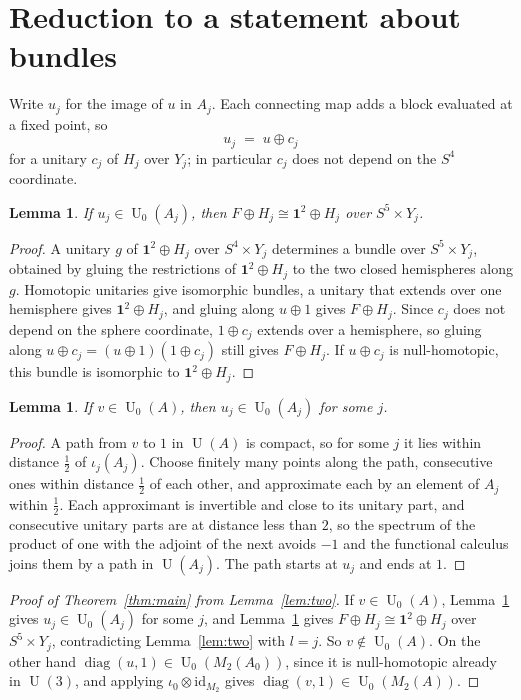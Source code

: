 \documentclass[11pt]{amsart}
\newtheorem{lemma}[theorem]{Lemma}
\theoremstyle{plain}
\theoremstyle{definition}
\newcommand{\U}{\operatorname{U}}
\newcommand{\Uz}{\operatorname{U}_0}
\begin{document}
\section{Reduction to a statement about bundles}
\label{sec:reduction}

Write $u_j$ for the image of $u$ in $A_j$.  Each connecting map adds a block
evaluated at a fixed point, so
\[
  u_j \;=\; u \oplus c_j
\]
for a unitary $c_j$ of $H_j$ over $Y_j$; in particular $c_j$ does not depend
on the $S^4$ coordinate.

\begin{lemma}
\label{lem:stage}
If $u_j \in \Uz(A_j)$, then $F \oplus H_j \cong \mathbf 1^2 \oplus H_j$ over
$S^5 \times Y_j$.
\end{lemma}

\begin{proof}
A unitary $g$ of $\mathbf 1^2 \oplus H_j$ over $S^4 \times Y_j$ determines a
bundle over $S^5 \times Y_j$, obtained by gluing the restrictions of
$\mathbf 1^2 \oplus H_j$ to the two closed hemispheres along $g$.  Homotopic
unitaries give isomorphic bundles, a unitary that extends over one hemisphere
gives $\mathbf 1^2 \oplus H_j$, and gluing along $u \oplus 1$ gives
$F \oplus H_j$.  Since $c_j$ does not depend on the sphere coordinate,
$1 \oplus c_j$ extends over a hemisphere, so gluing along
$u \oplus c_j = (u \oplus 1)(1 \oplus c_j)$ still gives $F \oplus H_j$.  If
$u \oplus c_j$ is null-homotopic, this bundle is isomorphic to
$\mathbf 1^2 \oplus H_j$.
\end{proof}

\begin{lemma}
\label{lem:limit}
If $v \in \Uz(A)$, then $u_j \in \Uz(A_j)$ for some $j$.
\end{lemma}

\begin{proof}
A path from $v$ to $1$ in $\U(A)$ is compact, so for some $j$ it lies within
distance $\tfrac12$ of $\iota_j(A_j)$.  Choose finitely many points along the
path, consecutive ones within distance $\tfrac12$ of each other, and
approximate each by an element of $A_j$ within $\tfrac12$.  Each approximant
is invertible and close to its unitary part, and consecutive unitary parts are
at distance less than $2$, so the spectrum of the product of one with the
adjoint of the next avoids $-1$ and the functional calculus joins them by a
path in $\U(A_j)$.  The path starts at $u_j$ and ends at $1$.
\end{proof}

\begin{proof}[Proof of Theorem~\ref{thm:main} from Lemma~\ref{lem:two}]
If $v \in \Uz(A)$, Lemma~\ref{lem:limit} gives $u_j \in \Uz(A_j)$ for some
$j$, and Lemma~\ref{lem:stage} gives $F \oplus H_j \cong \mathbf 1^2 \oplus
H_j$ over $S^5 \times Y_j$, contradicting Lemma~\ref{lem:two} with $l = j$.
So $v \notin \Uz(A)$.  On the other hand
$\operatorname{diag}(u,1) \in \Uz(M_2(A_0))$, since it is null-homotopic
already in $\U(3)$, and applying $\iota_0 \otimes \mathrm{id}_{M_2}$ gives
$\operatorname{diag}(v,1) \in \Uz(M_2(A))$.
\end{proof}
\end{document}

